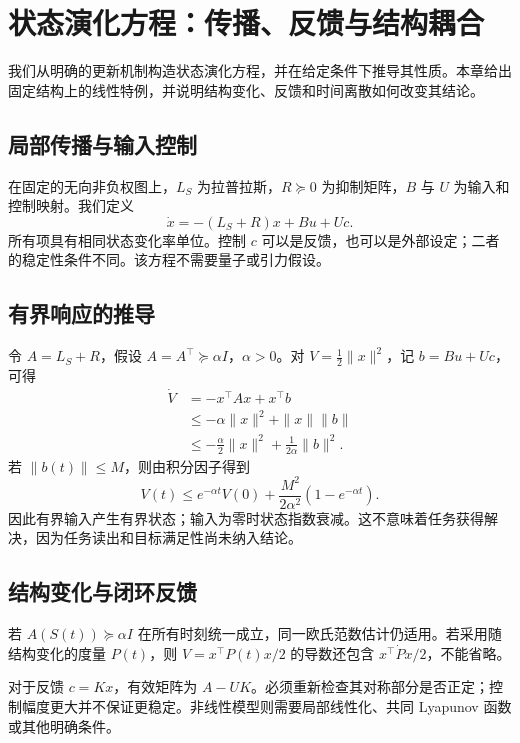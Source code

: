 \chapter{状态演化方程：传播、反馈与结构耦合}
\label{chp:evolution_equation_ch}
\label{sec:section_2382}
\label{sec:section_954}
\label{sec:section_9016}
\label{sec:micro_structure_of_inertia}
\label{sec:broadband_excitation}
\label{sec:meaning_phase_transition}
\label{sec:section_4495}

我们从明确的更新机制构造状态演化方程，并在给定条件下推导其性质。本章给出固定结构上的线性特例，并说明结构变化、反馈和时间离散如何改变其结论。
\section{局部传播与输入控制}
在固定的无向非负权图上，$L_S$ 为拉普拉斯，$R\succeq0$ 为抑制矩阵，$B$ 与 $U$ 为输入和控制映射。我们定义
\begin{equation}\dot x=-(L_S+R)x+Bu+Uc.\label{eq:hsf_linear_state}\end{equation}
所有项具有相同状态变化率单位。控制 $c$ 可以是反馈，也可以是外部设定；二者的稳定性条件不同。该方程不需要量子或引力假设。
\section{有界响应的推导}
令 $A=L_S+R$，假设 $A=A^\top\succeq\alpha I$，$\alpha>0$。对 $V=\frac12\|x\|^2$，记 $b=Bu+Uc$，可得
\begin{align}\dot V&=-x^\top Ax+x^\top b\\
&\le-\alpha\|x\|^2+\|x\|\|b\|\\
&\le-\frac\alpha2\|x\|^2+\frac{1}{2\alpha}\|b\|^2.
\end{align}
若 $\|b(t)\|\le M$，则由积分因子得到
\begin{equation}V(t)\le e^{-\alpha t}V(0)+\frac{M^2}{2\alpha^2}(1-e^{-\alpha t}).\end{equation}
因此有界输入产生有界状态；输入为零时状态指数衰减。这不意味着任务获得解决，因为任务读出和目标满足性尚未纳入结论。
\section{结构变化与闭环反馈}
若 $A(S(t))\succeq\alpha I$ 在所有时刻统一成立，同一欧氏范数估计仍适用。若采用随结构变化的度量 $P(t)$，则 $V=x^\top P(t)x/2$ 的导数还包含 $x^\top\dot P x/2$，不能省略。

对于反馈 $c=Kx$，有效矩阵为 $A-UK$。必须重新检查其对称部分是否正定；控制幅度更大并不保证更稳定。非线性模型则需要局部线性化、共同 Lyapunov 函数或其他明确条件。
